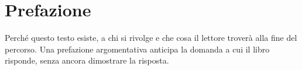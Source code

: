 \chapter*{Prefazione}

Perché questo testo esiste, a chi si rivolge e che cosa il lettore troverà
alla fine del percorso. Una prefazione argomentativa anticipa la domanda a cui
il libro risponde, senza ancora dimostrare la risposta.
